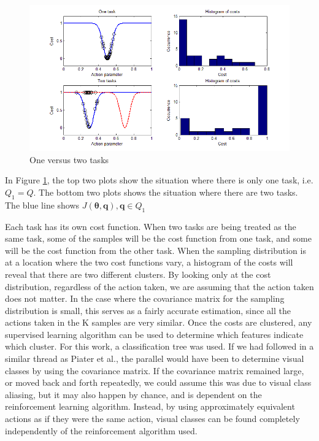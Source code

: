 \documentclass[12pt]{article}
\newcommand{\taskp}  {\ensuremath{\mathbf{q}}}
\newcommand{\costf}  {\ensuremath{J}}
\newcommand{\app}    {\ensuremath{\bm{\theta}}}
\newcommand{\taskpsp}{\ensuremath{Q}}
\begin{document}
\begin{figure}[ht]
  \centering
  \includegraphics[width=0.9\columnwidth]{one_vs_two_tasks.png}
  \caption{One versus two tasks}
  \label{fig:1vs2tasks}
\end{figure} 

In Figure \ref{fig:1vs2tasks}, the top two plots show the situation where there is only one task, i.e. $\taskpsp_1 = \taskpsp$. The bottom two plots shows the situation where there are two tasks. The blue line shows $\costf(\app,\taskp), \taskp \in \taskpsp_1$

\color{red}Each task has its own cost function. When two tasks are being treated as the same task, some of the samples will be the cost function from one task, and some will be the cost function from the other task. \color{black} When the sampling distribution is at a location where the two cost functions vary, a histogram of the costs will reveal that there are two different clusters. By looking only at the cost distribution, regardless of the action taken, we are assuming that the action taken does not matter. In the case where the covariance matrix for the sampling distribution is small, this serves as a fairly accurate estimation, since all the actions taken in the K samples are very similar. Once the costs are clustered, any supervised learning algorithm can be used to determine which features indicate which cluster. For this work, a classification tree was used. If we had followed in a similar thread as Piater et al., the parallel would have been to determine visual classes by using the covariance matrix. If the covariance matrix remained large, or moved back and forth repeatedly, we could assume this was due to visual class aliasing, but it may also happen by chance, and is dependent on the reinforcement learning algorithm. Instead, by using approximately equivalent actions as if they were the same action, visual classes can be found completely independently of the reinforcement algorithm used. 
\end{document}
